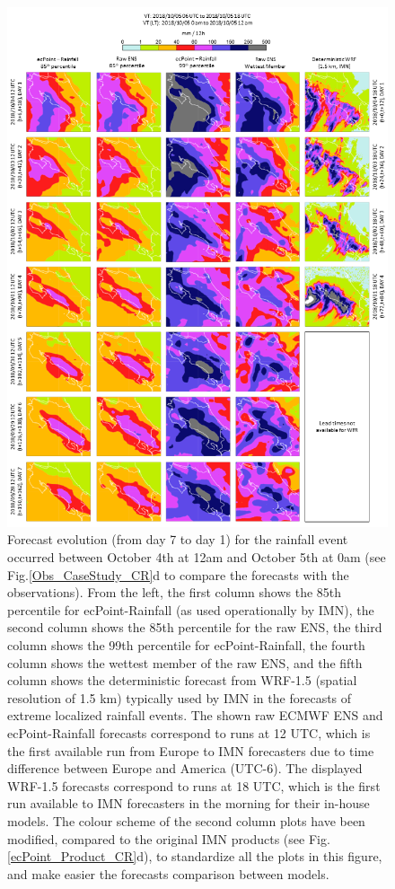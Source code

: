 \begin{figure}
\centerline{\includegraphics[width=39pc]{manuscript/Figures/Results_CaseStudy_Comparison_Models_CR.png}}
\caption{Forecast evolution (from day 7 to day 1) for the rainfall event occurred between October 4th at 12am and October 5th at 0am (see Fig.\ref{Obs_CaseStudy_CR}d to compare the forecasts with the observations). From the left, the first column shows the 85th percentile for ecPoint-Rainfall (as used operationally by IMN), the second column shows the 85th percentile for the raw ENS, the third column shows the 99th percentile for ecPoint-Rainfall, the fourth column shows the wettest member of the raw ENS, and the fifth column shows the deterministic forecast from WRF-1.5 (spatial resolution of 1.5 km) typically used by IMN in the forecasts of extreme localized rainfall events. The shown raw ECMWF ENS and ecPoint-Rainfall forecasts correspond to runs at 12 UTC, which is the first available run from Europe to IMN forecasters due to time difference between Europe and America (UTC-6). The displayed WRF-1.5 forecasts correspond to runs at 18 UTC, which is the first run available to IMN forecasters in the morning for their in-house models. The colour scheme of the second column plots have been modified, compared to the original IMN products (see Fig.\ref{ecPoint_Product_CR}d), to standardize all the plots in this figure, and make easier the forecasts comparison between models.}
\label{Results_CaseStudy_Comparison_Models_CR}
\end{figure}


